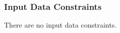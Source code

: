 \documentclass[12pt]{article}
\begin{document}
\subsubsection{Input Data Constraints} \label{sec_DataConst}

There are no input data constraints.





\end{document}
